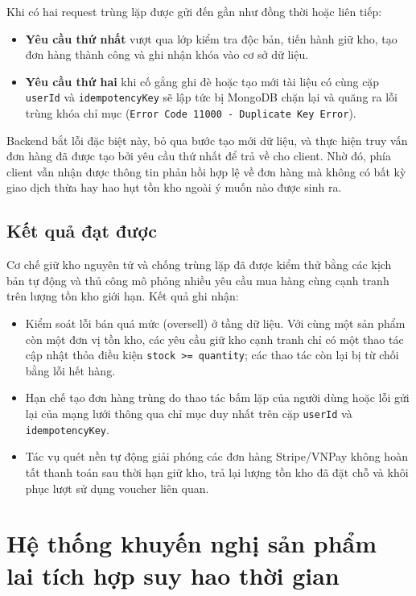 \documentclass[../DoAn.tex]{subfiles}
\begin{document}
Khi có hai request trùng lặp được gửi đến gần như đồng thời hoặc liên tiếp:
\begin{itemize}
    \item \textbf{Yêu cầu thứ nhất} vượt qua lớp kiểm tra độc bản, tiến hành giữ kho, tạo đơn hàng thành công và ghi nhận khóa vào cơ sở dữ liệu.
    \item \textbf{Yêu cầu thứ hai} khi cố gắng ghi đè hoặc tạo mới tài liệu có cùng cặp \texttt{userId} và \texttt{idempotencyKey} sẽ lập tức bị MongoDB chặn lại và quăng ra lỗi trùng khóa chỉ mục (\texttt{Error Code 11000 - Duplicate Key Error}).
\end{itemize}

Backend bắt lỗi đặc biệt này, bỏ qua bước tạo mới dữ liệu, và thực hiện truy vấn đơn hàng đã được tạo bởi yêu cầu thứ nhất để trả về cho client. Nhờ đó, phía client vẫn nhận được thông tin phản hồi hợp lệ về đơn hàng mà không có bất kỳ giao dịch thừa hay hao hụt tồn kho ngoài ý muốn nào được sinh ra.

\subsection{Kết quả đạt được}
Cơ chế giữ kho nguyên tử và chống trùng lặp đã được kiểm thử bằng các kịch bản tự động và thủ công mô phỏng nhiều yêu cầu mua hàng cùng cạnh tranh trên lượng tồn kho giới hạn. Kết quả ghi nhận:
\begin{itemize}
    \item Kiểm soát lỗi bán quá mức (oversell) ở tầng dữ liệu. Với cùng một sản phẩm còn một đơn vị tồn kho, các yêu cầu giữ kho cạnh tranh chỉ có một thao tác cập nhật thỏa điều kiện \texttt{stock >= quantity}; các thao tác còn lại bị từ chối bằng lỗi hết hàng.
    \item Hạn chế tạo đơn hàng trùng do thao tác bấm lặp của người dùng hoặc lỗi gửi lại của mạng lưới thông qua chỉ mục duy nhất trên cặp \texttt{userId} và \texttt{idempotencyKey}.
    \item Tác vụ quét nền tự động giải phóng các đơn hàng Stripe/VNPay không hoàn tất thanh toán sau thời hạn giữ kho, trả lại lượng tồn kho đã đặt chỗ và khôi phục lượt sử dụng voucher liên quan.
\end{itemize}

\section{Hệ thống khuyến nghị sản phẩm lai tích hợp suy hao thời gian}
\label{section:5.2}
\end{document}
